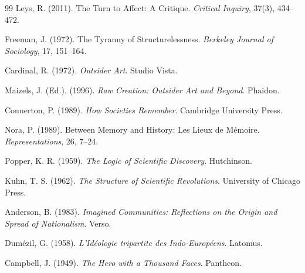 \documentclass[11pt, a4paper]{article}
\theoremstyle{named}
\begin{document}
\begin{thebibliography}{99}
Leys, R. (2011).
The Turn to Affect: A Critique.
\textit{Critical Inquiry}, 37(3), 434--472.

Freeman, J. (1972).
The Tyranny of Structurelessness.
\textit{Berkeley Journal of Sociology}, 17, 151--164.

Cardinal, R. (1972).
\textit{Outsider Art}.
Studio Vista.

Maizels, J. (Ed.). (1996).
\textit{Raw Creation: Outsider Art and Beyond}.
Phaidon.

Connerton, P. (1989).
\textit{How Societies Remember}.
Cambridge University Press.

Nora, P. (1989).
Between Memory and History: Les Lieux de M\'{e}moire.
\textit{Representations}, 26, 7--24.

Popper, K. R. (1959).
\textit{The Logic of Scientific Discovery}.
Hutchinson.

Kuhn, T. S. (1962).
\textit{The Structure of Scientific Revolutions}.
University of Chicago Press.

Anderson, B. (1983).
\textit{Imagined Communities: Reflections on the Origin and Spread of Nationalism}.
Verso.

Dum\'{e}zil, G. (1958).
\textit{L'Id\'{e}ologie tripartite des Indo-Europ\'{e}ens}.
Latomus.

Campbell, J. (1949).
\textit{The Hero with a Thousand Faces}.
Pantheon.

\end{thebibliography}

\end{document}
